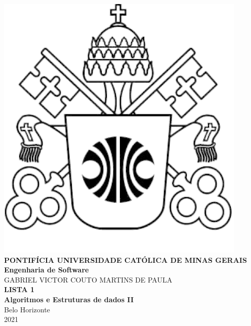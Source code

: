 \documentclass[
	12pt,				%
	openright,			%
	twoside,			%
	a4paper,			%
	english,			%
	french,				%
	spanish,			%
	brazil				%
	]{abntex2}
\begin{document}
    

\frenchspacing 

\begin{center}
    \thispagestyle{empty}
    \includegraphics[scale=0.7]{figuras/PUC.png}\\
\normalsize
\textbf{PONTIFÍCIA UNIVERSIDADE CATÓLICA DE MINAS GERAIS}\\
\textbf{Engenharia de Software}\\
\vspace{3.5cm}
GABRIEL VICTOR COUTO MARTINS DE PAULA\\
\vspace{4cm}
\textbf{LISTA 1 \\ Algoritmos e Estruturas de dados II}
\\
\vspace{9cm}
Belo Horizonte\\
2021
\end{center}
\newpage
\imprimirfolhaderosto
\end{document}
